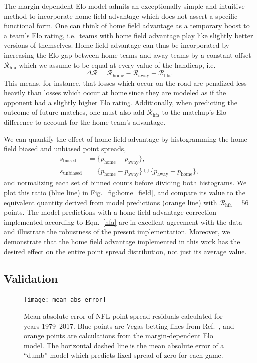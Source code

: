 \documentclass[aps,prc,reprint,amsmath,superscriptaddress,nofootinbib]{revtex4-1}
\begin{document}
The margin-dependent Elo model admits an exceptionally simple and intuitive method to incorporate home field advantage which does not assert a specific functional form.
One can think of home field advantage as a temporary boost to a team's Elo rating, i.e.\ teams with home field advantage play like slightly better versions of themselves.  
Home field advantage can thus be incorporated by increasing the Elo gap between home teams and away teams by a constant offset $\mathcal{R}_\text{hfa}$ which we assume to be equal at every value of the handicap, i.e.\
\begin{equation}
  \label{hfa}
  \Delta \mathcal{R} = \mathcal{R}_\text{home} - \mathcal{R}_\text{away} + \mathcal{R}_\text{hfa}.
\end{equation}
This means, for instance, that losses which occur on the road are penalized less heavily than losses which occur at home since they are modeled as if the opponent had a slightly higher Elo rating.
Additionally, when predicting the outcome of future matches, one must also add $\mathcal{R}_\text{hfa}$ to the matchup's Elo difference to account for the home team's advantage.

We can quantify the effect of home field advantage by histogramming the home-field biased and unbiased point spreads,
\begin{align}
  s_\text{biased} &= \{p_\text{home} - p_\text{away}\},\nonumber \\
  s_\text{unbiased} &= \{p_\text{home} - p_\text{away}\} \cup \{p_\text{away} - p_\text{home}\},
\end{align}
and normalizing each set of binned counts before dividing both histograms.
We plot this ratio (blue line) in Fig.~\ref{fig:home_field}, and compare its value to the equivalent quantity derived from model predictions (orange line) with $\mathcal{R}_\text{hfa} = 56$ points.
The model predictions with a home field advantage correction implemented according to Eqn.~\eqref{hfa} are in excellent agreement with the data and illustrate the robustness of the present implementation. 
Moreover, we demonstrate that the home field advantage implemented in this work has the desired effect on the entire point spread distribution, not just its average value. 

\subsection{Validation}

\begin{figure}
    \texttt{[image: mean\_abs\_error]}
    \caption{\label{fig:mean_abs_error} Mean absolute error of NFL point spread residuals calculated for years 1979--2017. Blue points are Vegas betting lines from Ref.~\cite{vegaslines}, and orange points are calculations from the margin-dependent Elo model. The horizontal dashed line is the mean absolute error of a ``dumb'' model which predicts fixed spread of zero for each game.}
\end{figure}
\end{document}
